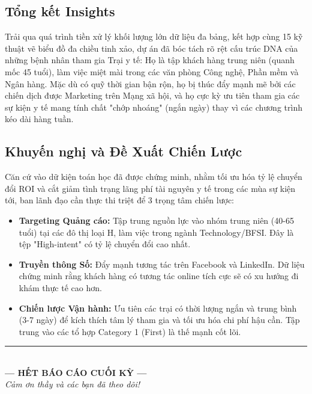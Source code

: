 \documentclass[12pt,a4paper]{article}
\begin{document}
\subsection{Tổng kết Insights}
Trải qua quá trình tiền xử lý khối lượng lớn dữ liệu đa bảng, kết hợp cùng 15 kỹ thuật vẽ biểu đồ đa chiều tinh xảo, dự án đã bóc tách rõ rệt cấu trúc DNA của những bệnh nhân tham gia Trại y tế:
Họ là tập khách hàng trung niên (quanh mốc 45 tuổi), làm việc miệt mài trong các văn phòng Công nghệ, Phần mềm và Ngân hàng. Mặc dù có quỹ thời gian bận rộn, họ bị thúc đẩy mạnh mẽ bởi các chiến dịch được Marketing trên Mạng xã hội, và họ cực kỳ ưu tiên tham gia các sự kiện y tế mang tính chất "chớp nhoáng" (ngắn ngày) thay vì các chương trình kéo dài hàng tuần.

\subsection{Khuyến nghị và Đề Xuất Chiến Lược}
Căn cứ vào dữ kiện toán học đã được chứng minh, nhằm tối ưu hóa tỷ lệ chuyển đổi ROI và cắt giảm tình trạng lãng phí tài nguyên y tế trong các mùa sự kiện tới, ban lãnh đạo cần thực thi triệt để 3 trọng tâm chiến lược:

\begin{itemize}
    \item \textbf{Targeting Quảng cáo:} Tập trung nguồn lực vào nhóm trung niên (40-65 tuổi) tại các đô thị loại H, làm việc trong ngành Technology/BFSI. Đây là tệp "High-intent" có tỷ lệ chuyển đổi cao nhất.
    \item \textbf{Truyền thông Số:} Đẩy mạnh tương tác trên Facebook và LinkedIn. Dữ liệu chứng minh rằng khách hàng có tương tác online tích cực sẽ có xu hướng đi khám thực tế cao hơn.
    \item \textbf{Chiến lược Vận hành:} Ưu tiên các trại có thời lượng ngắn và trung bình (3-7 ngày) để kích thích tâm lý tham gia và tối ưu hóa chi phí hậu cần. Tập trung vào các tổ hợp Category 1 (First) là thế mạnh cốt lõi.
\end{itemize}

\vspace{2cm}

\begin{center}
    \rule{0.7\textwidth}{0.5pt}\\[0.5cm]
    {\large \textbf{--- HẾT BÁO CÁO CUỐI KỲ ---}}\\[0.3cm]
    \textit{Cảm ơn thầy và các bạn đã theo dõi!}
\end{center}
\end{document}
